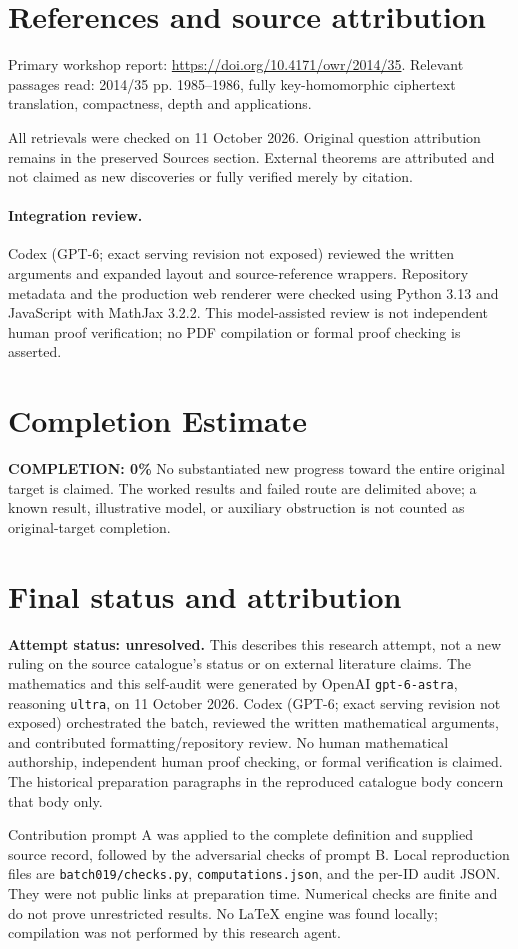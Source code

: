\documentclass[11pt]{article}
\begin{document}
\section{References and source attribution}
Primary workshop report: \url{https://doi.org/10.4171/owr/2014/35}. Relevant passages read: 2014/35 pp. 1985--1986, fully key-homomorphic ciphertext translation, compactness, depth and applications.

All retrievals were checked on 11 October 2026. Original question attribution remains in the preserved Sources section. External theorems are attributed and not claimed as new discoveries or fully verified merely by citation.


\paragraph{Integration review.} Codex (GPT-6; exact serving revision not exposed) reviewed the written arguments and expanded layout and source-reference wrappers. Repository metadata and the production web renderer were checked using Python 3.13 and JavaScript with MathJax 3.2.2. This model-assisted review is not independent human proof verification; no PDF compilation or formal proof checking is asserted.

\section{Completion Estimate}
\noindent\textbf{COMPLETION: 0\%}
No substantiated new progress toward the entire original target is claimed. The worked results and failed route are delimited above; a known result, illustrative model, or auxiliary obstruction is not counted as original-target completion.

\section{Final status and attribution}
\textbf{Attempt status: unresolved.} This describes this research attempt, not a new ruling on the source catalogue's status or on external literature claims.
The mathematics and this self-audit were generated by OpenAI \texttt{gpt-6-astra}, reasoning \texttt{ultra}, on 11 October 2026. Codex (GPT-6; exact serving revision not exposed) orchestrated the batch, reviewed the written mathematical arguments, and contributed formatting/repository review. No human mathematical authorship, independent human proof checking, or formal verification is claimed. The historical preparation paragraphs in the reproduced catalogue body concern that body only.

Contribution prompt A was applied to the complete definition and supplied source record, followed by the adversarial checks of prompt B. Local reproduction files are \texttt{batch019/checks.py}, \texttt{computations.json}, and the per-ID audit JSON. They were not public links at preparation time. Numerical checks are finite and do not prove unrestricted results. No LaTeX engine was found locally; compilation was not performed by this research agent.
\end{document}
